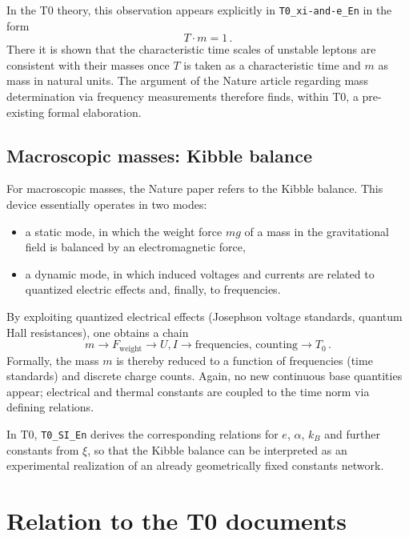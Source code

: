 In the T0 theory, this observation appears explicitly in \texttt{T0\_xi-and-e\_En}
in the form
\begin{equation}
  T \cdot m = 1 \, .
\end{equation}
There it is shown that the characteristic time scales of unstable leptons are
consistent with their masses once $T$ is taken as a characteristic time and $m$
as mass in natural units. The argument of the Nature article regarding mass
determination via frequency measurements therefore finds, within T0, a
pre-existing formal elaboration.

\subsection{Macroscopic masses: Kibble balance}

For macroscopic masses, the Nature paper refers to the Kibble balance. This
device essentially operates in two modes:
\begin{itemize}
  \item a static mode, in which the weight force $m g$ of a mass in the
        gravitational field is balanced by an electromagnetic force,
  \item a dynamic mode, in which induced voltages and currents are related to
        quantized electric effects and, finally, to frequencies.
\end{itemize}

By exploiting quantized electrical effects (Josephson voltage standards,
quantum Hall resistances), one obtains a chain
\begin{equation}
  m \longrightarrow F_{\text{weight}} \longrightarrow
  U, I \longrightarrow \text{frequencies, counting} \longrightarrow T_0 \, .
\end{equation}
Formally, the mass $m$ is thereby reduced to a function of frequencies (time
standards) and discrete charge counts. Again, no new continuous base quantities
appear; electrical and thermal constants are coupled to the time norm via
defining relations.

In T0, \texttt{T0\_SI\_En} derives the corresponding relations for $e$,
$\alpha$, $k_B$ and further constants from $\xi$, so that the Kibble balance
can be interpreted as an experimental realization of an already geometrically
fixed constants network.

\section{Relation to the T0 documents}
\label{sec:t0_relation}

